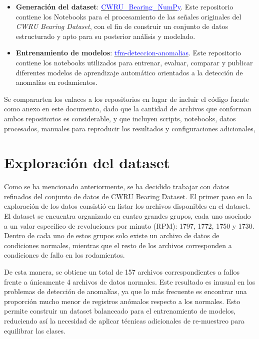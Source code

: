 \documentclass[11pt,a4paper,spanish]{book}
\numberwithin{equation}{chapter}
\numberwithin{figure}{chapter}
\begin{document}
\begin{itemize}
    \item \textbf{Generación del dataset}: \href{https://github.com/jelambrar96-unir/CWRU_Bearing_NumPy}{\underline{\textcolor{blue}{CWRU\_Bearing\_NumPy}}}. Este repositorio contiene los Notebooks para el procesamiento de las señales originales del \textit{CWRU Bearing Dataset}, con el fin de construir un conjunto de datos estructurado y apto para su posterior análisis y modelado.
    
    \item \textbf{Entrenamiento de modelos}: \href{https://github.com/jelambrar96-unir/tfm-deteccion-anomalias/tree/main/notebooks}{\underline{\textcolor{blue}{tfm-deteccion-anomalias}}}. Este repositorio contiene los notebooks utilizados para entrenar, evaluar,  comparar y publicar diferentes modelos de aprendizaje automático orientados a la detección de anomalías en rodamientos.
\end{itemize}

Se compararten los enlaces a los repositorios en lugar de incluir el código fuente como anexo en este documento, dado que la cantidad de archivos que conforman ambos repositorios es considerable, y que incluyen scripts, notebooks, datos procesados, manuales para reproducir los resultados y configuraciones adicionales, 


\section{Exploración del dataset}

Como se ha mencionado anteriormente, se ha decidido trabajar con datos refinados del conjunto de datos de CWRU Bearing Dataset. El primer paso en la exploración de los datos consistió en listar los archivos disponibles en el dataset. El dataset se encuentra organizado en cuatro grandes grupos, cada uno asociado a un valor específico de revoluciones por minuto (RPM): 1797, 1772, 1750 y 1730. Dentro de cada uno de estos grupos solo existe un archivo de datos de condiciones normales, mientras que el resto de los archivos corresponden a condiciones de fallo en los rodamientos.


De esta manera, se obtiene un total de 157 archivos correspondientes a fallos frente a únicamente 4 archivos de datos normales. Este resultado es inusual en los problemas de detección de anomalías, ya que lo más frecuente es encontrar una proporción mucho menor de registros anómalos respecto a los normales. Esto permite construir un dataset balanceado para el entrenamiento de modelos, reduciendo así la necesidad de aplicar técnicas adicionales de re-muestreo para equilibrar las clases.
\end{document}

